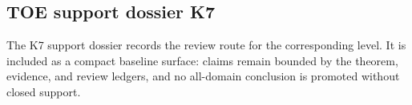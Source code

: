 \subsection{TOE support dossier K7}
The K7 support dossier records the review route for the corresponding level. It is included as a compact baseline surface: claims remain bounded by the theorem, evidence, and review ledgers, and no all-domain conclusion is promoted without closed support.
